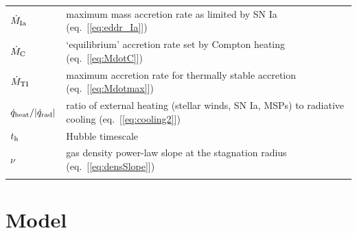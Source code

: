 \documentclass[usenatbib,fleqn]{mn2e}
\begin{document}
\begin{table}
\begin{threeparttable}
\begin{minipage}{18cm}
\begin{tabular}{ll}
$\dot{M}_{\rm Ia}$ & maximum mass accretion rate as limited by SN Ia (eq.~[\ref{eq:eddr_Ia}]) \\
$\dot{M}_{\rm C}$ & `equilibrium' accretion rate set by Compton heating (eq.~[\ref{eq:MdotC}]) \\
$\dot{M}_{\rm TI}$ & maximum accretion rate for thermally stable accretion (eq.~[\ref{eq:Mdotmax}]) \\
$\dot{q}_{\rm heat}/|\dot{q}_{\rm rad}|$ & ratio of external heating (stellar winds, SN Ia, MSPs) to radiative cooling (eq.~[\ref{eq:cooling2}]) \\
$t_{\rm h}$ & Hubble timescale \\
$\nu$ & gas density power-law slope at the stagnation radius
(eq.~[\ref{eq:densSlope}]) \\
\hline
\label{table:definitions}  
\end{tabular}
\end{minipage}
\end{threeparttable}

\end{table}


\section{Model}
\label{sec:model}
\end{document}
